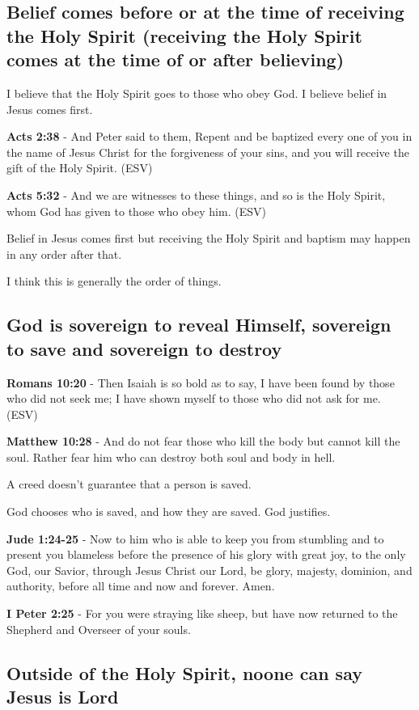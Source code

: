 \documentclass[11pt]{article}
\begin{document}
\subsection{Belief comes before or at the time of receiving the Holy Spirit (receiving the Holy Spirit comes at the time of or after believing)}
\label{sec:org2becc9e}
I believe that the Holy Spirit goes to those who obey God. I believe belief in Jesus comes first.

\textbf{Acts 2:38} - And Peter said to them, Repent and be baptized every one of you in the name of Jesus Christ for the forgiveness of your sins, and you will receive the gift of the Holy Spirit. (ESV)

\textbf{Acts 5:32} - And we are witnesses to these things, and so is the Holy Spirit, whom God has given to those who obey him. (ESV)

Belief in Jesus comes first but receiving the Holy Spirit and baptism may happen in any order after that.

I think this is generally the order of things.

\subsection{God is sovereign to reveal Himself, sovereign to save and sovereign to destroy}
\label{sec:org78f6b75}

\textbf{Romans 10:20} - Then Isaiah is so bold as to say, I have been found by those who did not seek me; I have shown myself to those who did not ask for me. (ESV)

\textbf{Matthew 10:28} - And do not fear those who kill the body but cannot kill the soul. Rather fear him who can destroy both soul and body in hell.

A creed doesn't guarantee that a person is saved.

God chooses who is saved, and how they are saved.
God justifies.

\textbf{Jude 1:24-25} - Now to him who is able to keep you from stumbling and to present you blameless before the presence of his glory with great joy, to the only God, our Savior, through Jesus Christ our Lord, be glory, majesty, dominion, and authority, before all time and now and forever. Amen.

\textbf{I Peter 2:25} - For you were straying like sheep, but have now returned to the Shepherd and Overseer of your souls.

\subsection{Outside of the Holy Spirit, noone can say Jesus is Lord}
\label{sec:org15d8bd0}
\end{document}
